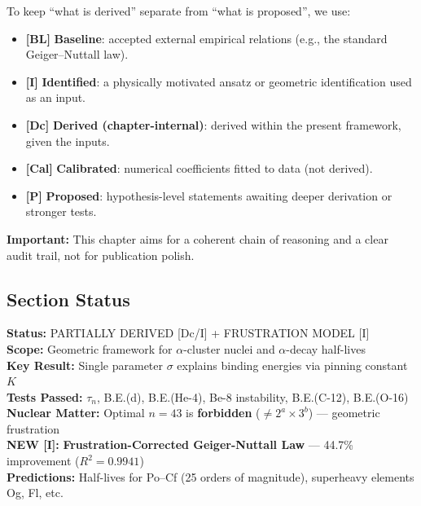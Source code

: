 To keep ``what is derived'' separate from ``what is proposed'', we use:
\begin{itemize}
    \item \textbf{[BL]} \textbf{Baseline}: accepted external empirical relations (e.g., the standard Geiger--Nuttall law).
    \item \textbf{[I]} \textbf{Identified}: a physically motivated ansatz or geometric identification used as an input.
    \item \textbf{[Dc]} \textbf{Derived (chapter-internal)}: derived within the present framework, given the inputs.
    \item \textbf{[Cal]} \textbf{Calibrated}: numerical coefficients fitted to data (not derived).
    \item \textbf{[P]} \textbf{Proposed}: hypothesis-level statements awaiting deeper derivation or stronger tests.
\end{itemize}

\textbf{Important:} This chapter aims for a coherent chain of reasoning and a clear audit trail, not for publication polish.

\subsection{Section Status}
\label{subsec:section-status}

\begin{tcolorbox}[colback=blue!5!white, colframe=blue!75!black, title=Section Status]
\textbf{Status:} PARTIALLY DERIVED [Dc/I] + FRUSTRATION MODEL [I] \\
\textbf{Scope:} Geometric framework for $\alpha$-cluster nuclei and $\alpha$-decay half-lives \\
\textbf{Key Result:} Single parameter $\sigma$ explains binding energies via pinning constant $K$ \\
\textbf{Tests Passed:} $\tau_n$, B.E.(d), B.E.(He-4), Be-8 instability, B.E.(C-12), B.E.(O-16) \\
\textbf{Nuclear Matter:} Optimal $n = 43$ is \textbf{forbidden} ($\neq 2^a \times 3^b$) --- geometric frustration \\
\textbf{NEW [I]:} \textbf{Frustration-Corrected Geiger-Nuttall Law} --- 44.7\% improvement ($R^2 = 0.9941$) \\
\textbf{Predictions:} Half-lives for Po--Cf (25 orders of magnitude), superheavy elements Og, Fl, etc.
\end{tcolorbox}

